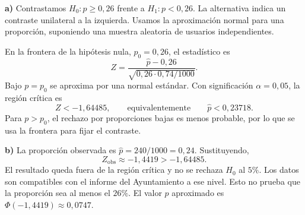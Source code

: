 \textbf{a)} Contrastamos $H_0:p\ge0{,}26$ frente a $H_1:p<0{,}26$. La alternativa indica un contraste unilateral a la izquierda. Usamos la aproximación normal para una proporción, suponiendo una muestra aleatoria de usuarios independientes.

En la frontera de la hipótesis nula, $p_0=0{,}26$, el estadístico es
\[
 Z=\frac{\hat p-0{,}26}{\sqrt{0{,}26\cdot0{,}74/1000}}.
\]
Bajo $p=p_0$ se aproxima por una normal estándar. Con significación $\alpha=0{,}05$, la región crítica es
\[
 \boxed{Z<-1{,}64485},
 \qquad\text{equivalentemente}\qquad\hat p<0{,}23718.
\]
Para $p>p_0$, el rechazo por proporciones bajas es menos probable, por lo que se usa la frontera para fijar el contraste.

\textbf{b)} La proporción observada es $\hat p=240/1000=0{,}24$. Sustituyendo,
\[
 Z_{\mathrm{obs}}\approx-1{,}4419>-1{,}64485.
\]
El resultado queda fuera de la región crítica y no se rechaza $H_0$ al $5\%$. Los datos son compatibles con el informe del Ayuntamiento a ese nivel. Esto no prueba que la proporción sea al menos el $26\%$. El valor $p$ aproximado es $\Phi(-1{,}4419)\approx0{,}0747$.
